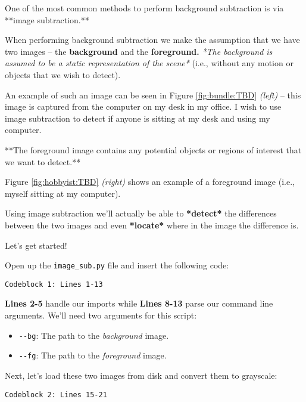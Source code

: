 One of the most common methods to perform background subtraction is via **image subtraction.**

When performing background subtraction we make the assumption that we have two images -- the \textbf{background} and the \textbf{foreground.} \textit{*The background is assumed to be a static representation of the scene*} (i.e., without any motion or objects that we wish to detect).

An example of such an image can be seen in Figure \ref{fig:bundle:TBD} \textit{(left)} -- this image is captured from the computer on my desk in my office. I wish to use image subtraction to detect if anyone is sitting at my desk and using my computer.

**The foreground image contains any potential objects or regions of interest that we want to detect.**

Figure \ref{fig:hobbyist:TBD} \textit{(right)} shows an example of a foreground image (i.e., myself sitting at my computer).

Using image subtraction we’ll actually be able to \textbf{*detect*} the differences between the two images and  even \textbf{*locate*} where in the image the difference is.

Let’s get started!

Open up the \texttt{image_sub.py} file and insert the following code:

\begin{verbatim}
Codeblock 1: Lines 1-13
\end{verbatim}

\textbf{Lines 2-5} handle our imports while \textbf{Lines 8-13} parse our command line arguments. We’ll need two arguments for this script:

\begin{itemize}
    \item \texttt{-{}-bg}: The path to the \textit{background} image.
    \item \texttt{-{}-fg}: The path to the \textit{foreground} image.
\end{itemize}

Next, let’s load these two images from disk and convert them to grayscale:

\begin{verbatim}
Codeblock 2: Lines 15-21
\end{verbatim}

